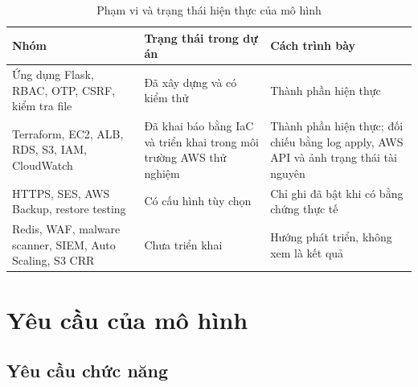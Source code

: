 \begin{table}[htbp]
    \centering
    \small
    \caption{Phạm vi và trạng thái hiện thực của mô hình}
    \label{tab:phamvi-hienthuc}

    \begin{tabularx}{\textwidth}{
        @{}
        >{\raggedright\arraybackslash}X
        >{\raggedright\arraybackslash}X
        >{\raggedright\arraybackslash}X
        @{}
    }
        \toprule
        \textbf{Nhóm}
        & \textbf{Trạng thái trong dự án}
        & \textbf{Cách trình bày} \\
        \midrule

        Ứng dụng Flask, RBAC, OTP, CSRF, kiểm tra file
        & Đã xây dựng và có kiểm thử
        & Thành phần hiện thực \\
        \addlinespace

        Terraform, EC2, ALB, RDS, S3, IAM, CloudWatch
        & Đã khai báo bằng IaC và triển khai trong
          môi trường AWS thử nghiệm
        & Thành phần hiện thực; đối chiếu bằng log apply,
          AWS API và ảnh trạng thái tài nguyên \\
        \addlinespace

        HTTPS, SES, AWS Backup, restore testing
        & Có cấu hình tùy chọn
        & Chỉ ghi đã bật khi có bằng chứng thực tế \\
        \addlinespace

        Redis, WAF, malware scanner, SIEM,
        Auto Scaling, S3 CRR
        & Chưa triển khai
        & Hướng phát triển, không xem là kết quả \\

        \bottomrule
    \end{tabularx}
\end{table}

\section{Yêu cầu của mô hình}

\subsection{Yêu cầu chức năng}

